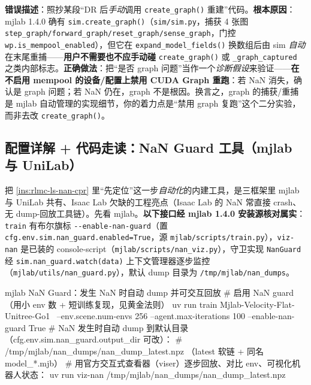 \begin{pitfall}
\textbf{错误描述}：照抄某段“DR 后\emph{手动}调用 \texttt{create\_graph()} 重建”代码。\textbf{根本原因}：mjlab 1.4.0 确有 \verb|sim.create_graph()|（\verb|sim/sim.py|，捕获 4 张图 \verb|step_graph/forward_graph/reset_graph/sense_graph|，门控 \verb|wp.is_mempool_enabled|），但它在 \verb|expand_model_fields()| 换数组后由 sim \emph{自动}在末尾重捕——\textbf{用户不需要也不应手动碰} \verb|create_graph()| 或 \verb|_graph_captured| 之类内部标志。\textbf{正确做法}：把“是否 graph 问题”当作一个\emph{诊断假设}来验证——\textbf{在不启用 mempool 的设备/配置上禁用 CUDA Graph 重跑}：若 NaN 消失，确认是 graph 问题；若 NaN 仍在，graph 不是根因。换言之，graph 的捕获/重捕是 mjlab 自动管理的实现细节，你的着力点是“禁用 graph 复跑”这个二分实验，而非去改 \texttt{create\_graph()}。
\end{pitfall}

\subsection{配置详解 + 代码走读：NaN Guard 工具（mjlab 与 UniLab）}
\label{sec:rlmc-ls-nanguard}

把 \cref{ins:rlmc-ls-nan-cpr} 里“先定位”这一步\emph{自动化}的内建工具，是三框架里 mjlab 与 UniLab 共有、Isaac Lab 欠缺的工程亮点（Isaac Lab 的 NaN 常直接 crash、无 dump-回放工具链）。先看 mjlab。\textbf{以下接口经 mjlab 1.4.0 安装源核对属实}：\verb|train| 有布尔旗标 \verb|--enable-nan-guard|（置 \verb|cfg.env.sim.nan_guard.enabled=True|，源 \verb|mjlab/scripts/train.py|），\verb|viz-nan| 是已装的 console-script（\verb|mjlab/scripts/nan_viz.py|），守卫实现 \verb|NanGuard| 经 \verb|sim.nan_guard.watch(data)| 上下文管理器逐步监控（\verb|mjlab/utils/nan_guard.py|），默认 dump 目录为 \verb|/tmp/mjlab/nan_dumps|。

\begin{codebox}[bash]{mjlab NaN Guard：发生 NaN 时自动 dump 并可交互回放}
# 启用 NaN guard（用小 env 数 + 短训练复现，见黄金法则）
uv run train Mjlab-Velocity-Flat-Unitree-Go1 \
    --env.scene.num-envs 256 --agent.max-iterations 100 --enable-nan-guard True
# NaN 发生时自动 dump 到默认目录（cfg.env.sim.nan_guard.output_dir 可改）：
#   /tmp/mjlab/nan_dumps/nan_dump_latest.npz   （latest 软链 + 同名 model_*.mjb）
# 用官方交互式查看器（viser）逐步回放、对比 env、可视化机器人状态：
uv run viz-nan /tmp/mjlab/nan_dumps/nan_dump_latest.npz
\end{codebox}

